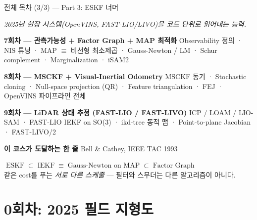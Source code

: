 \begin{frame}{전체 목차 (3/3) — Part 3: ESKF 너머}
  \begin{center}\small\itshape
    \color{gray} 2025년 현장 시스템(OpenVINS, FAST-LIO/LIVO)을 코드 단위로 읽어내는 능력.
  \end{center}
  \vspace{0.4em}

  \begin{block}{\textbf{7회차 — 관측가능성 + Factor Graph + MAP 최적화}}
    Observability 정의 · NIS 튜닝 · MAP $\equiv$ 비선형 최소제곱 ·
    Gauss-Newton / LM · Schur complement · Marginalization · iSAM2
  \end{block}

  \begin{block}{\textbf{8회차 — MSCKF + Visual-Inertial Odometry}}
    MSCKF 동기 · Stochastic cloning · \alert{Null-space projection} (QR) ·
    Feature triangulation · FEJ · OpenVINS 파이프라인 전체
  \end{block}

  \begin{block}{\textbf{9회차 — LiDAR 상태 추정 (FAST-LIO / FAST-LIVO)}}
    ICP / LOAM / LIO-SAM · \alert{FAST-LIO IEKF on SO(3)} ·
    ikd-tree 동적 맵 · Point-to-plane Jacobian · FAST-LIVO/2
  \end{block}

  \vspace{0.3em}
  \begin{exampleblock}{\textbf{이 코스가 도달하는 한 줄} \hfill \scriptsize Bell \& Cathey, IEEE TAC 1993}
    \begin{center}
      $\boxed{\;\text{ESKF}\;\subset\;\text{IEKF}\;\equiv\;\text{Gauss-Newton on MAP}\;\subset\;\text{Factor Graph}\;}$\\[0.2em]
      \scriptsize 같은 cost를 푸는 \emph{서로 다른 스케줄} — 필터와 스무더는 다른 알고리즘이 아니다.
    \end{center}
  \end{exampleblock}
\end{frame}


\section{0회차: 2025 필드 지형도}



